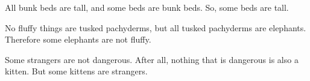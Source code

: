 \begin{exercises} 
 
\item  All bunk beds are tall, and some beds are bunk beds. So, some beds are tall.  



\item No fluffy things are tusked pachyderms, but all tusked pachyderms are elephants. Therefore some elephants are not fluffy.

 
\item Some strangers are not dangerous. After all, nothing that is dangerous is also a kitten. But some kittens are strangers. 


\end{exercises}
